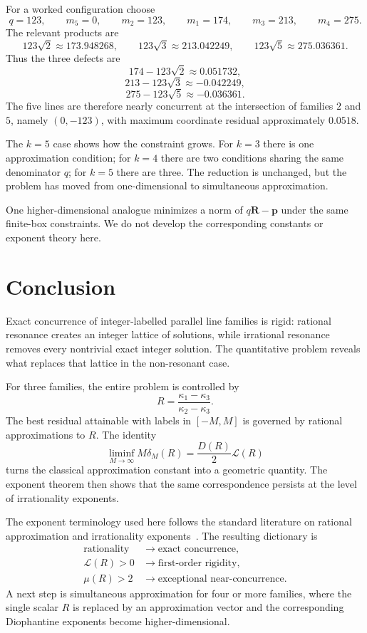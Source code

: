 \documentclass[11pt,a4paper]{article}
\newcommand{\deltam}{\delta_M}
\begin{document}
For a worked configuration choose
\[
q=123,
\qquad
m_5=0,
\qquad
m_2=123,
\qquad
m_1=174,
\qquad
m_3=213,
\qquad
m_4=275.
\]
The relevant products are
\[
123\sqrt2\approx173.948268,
\qquad
123\sqrt3\approx213.042249,
\qquad
123\sqrt5\approx275.036361.
\]
Thus the three defects are
\[
174-123\sqrt2\approx0.051732,
\]
\[
213-123\sqrt3\approx-0.042249,
\]
\[
275-123\sqrt5\approx-0.036361.
\]
The five lines are therefore nearly concurrent at the intersection of families $2$ and $5$,
namely $(0,-123)$, with maximum coordinate residual approximately $0.0518$.

The $k=5$ case shows how the constraint grows. For $k=3$ there is one approximation condition; for $k=4$ there are two conditions sharing the same denominator $q$; for $k=5$ there are three. The reduction is unchanged, but the problem has moved from one-dimensional to simultaneous approximation.

One higher-dimensional analogue minimizes a norm of $q\mathbf R-\mathbf p$ under the same finite-box constraints. We do not develop the corresponding constants or exponent theory here.

\section{Conclusion}
Exact concurrence of integer-labelled parallel line families is rigid: rational resonance creates
an integer lattice of solutions, while irrational resonance removes every nontrivial exact integer
solution. The quantitative problem reveals what replaces that lattice in the non-resonant case.

For three families, the entire problem is controlled by
\[
R=\frac{\kappa_1-\kappa_3}{\kappa_2-\kappa_3}.
\]
The best residual attainable with labels in $[-M,M]$ is governed by rational approximations to $R$.
The identity
\[
\boxed{
\liminf_{M\to\infty}M\deltam(R)
=\frac{D(R)}2\mathcal L(R)
}
\]
turns the classical approximation constant into a geometric quantity. The exponent theorem then
shows that the same correspondence persists at the level of irrationality exponents.

The exponent terminology used here follows the standard literature on rational approximation and irrationality exponents~\cite{bug,roth1955,waldschmidt2009}. The resulting dictionary is
\[
\begin{aligned}
\text{rationality} &\to \text{exact concurrence},\\
\mathcal L(R)>0 &\to \text{first-order rigidity},\\
\mu(R)>2 &\to \text{exceptional near-concurrence}.
\end{aligned}
\]
A next step is simultaneous approximation for four or more families, where the single scalar $R$ is
replaced by an approximation vector and the corresponding Diophantine exponents become higher-dimensional.
\end{document}
